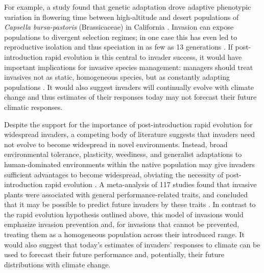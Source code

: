 \documentclass[11pt]{article}\usepackage[]{graphicx}\usepackage[]{color}
\begin{document}
    For example, a study found that genetic adaptation drove adaptive phenotypic variation in flowering time between high-altitude and desert populations of \textit{Capsella bursa-pastoris} (Brassicaceae) in California \parencite{Linde2001}. Invasion can expose populations to divergent selection regimes; in one case this has even led to reproductive isolation and thus speciation in as few as 13 generations \parencite{Hendry2000}. If post-introduction rapid evolution is this central to invader success, it would have important implications for invasive species management: managers should treat invasives not as static, homogeneous species, but as constantly adapting populations \parencite{Lee2002invasion}. It would also suggest invaders will continually evolve with climate change and thus estimates of their responses today may not forecast their future climatic responses. 
	
	Despite the support for the importance of post-introduction rapid evolution for widespread invaders, a competing body of literature suggests that invaders need not evolve to become widespread in novel environments. Instead, broad environmental tolerance, plasticity, weediness, and generalist adaptations to human-dominated environments within the native population may give invaders sufficient advantages to become widespread, obviating the necessity of post-introduction rapid evolution  \parencite{Richards2006,Schwartz1994,Bock2015,Rejmanek1996,Baker1965}. A meta-analysis of 117 studies found that invasive plants were associated with general performance-related traits, and concluded that it may be possible to predict future invaders by these traits \parencite{VanKleunen2010}. %
	In contrast to the rapid evolution hypothesis outlined above, this model of invasions would emphasize invasion prevention and, for invasions that cannot be prevented, treating them as a homogeneous population across their introduced range. It would also suggest that today's estimates of invaders' responses to climate can be used to forecast their future performance and, potentially, their future distributions with climate change. 
	
\end{document}

